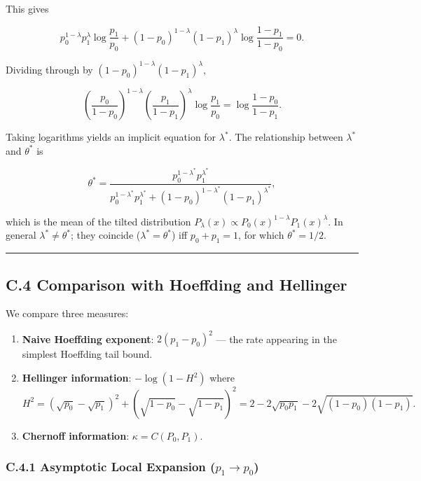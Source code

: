 \documentclass[
  12pt,
]{article}
\providecommand{\tightlist}{%
  \setlength{\itemsep}{0pt}\setlength{\parskip}{0pt}}
\begin{document}
This gives

\[
p_0^{1-\lambda}p_1^\lambda \log\frac{p_1}{p_0}
+ (1-p_0)^{1-\lambda}(1-p_1)^\lambda \log\frac{1-p_1}{1-p_0} = 0. \tag{C.5}
\]

Dividing through by \((1-p_0)^{1-\lambda}(1-p_1)^\lambda\),

\[
\left(\frac{p_0}{1-p_0}\right)^{1-\lambda}
\left(\frac{p_1}{1-p_1}\right)^{\lambda}
\log\frac{p_1}{p_0}
= \log\frac{1-p_0}{1-p_1}.
\]

Taking logarithms yields an implicit equation for \(\lambda^*\). The
relationship between \(\lambda^*\) and \(\theta^*\) is

\[
\theta^* = \frac{p_0^{1-\lambda^*} p_1^{\lambda^*}}
                 {p_0^{1-\lambda^*} p_1^{\lambda^*} + (1-p_0)^{1-\lambda^*}(1-p_1)^{\lambda^*}},
\]

which is the mean of the tilted distribution
\(P_\lambda(x) \propto P_0(x)^{1-\lambda} P_1(x)^\lambda\). In general
\(\lambda^* \neq \theta^*\); they coincide (\(\lambda^* = \theta^*\))
iff \(p_0 + p_1 = 1\), for which \(\theta^* = 1/2\).

\begin{center}\rule{0.5\linewidth}{0.5pt}\end{center}

\subsection{C.4 Comparison with Hoeffding and
Hellinger}\label{c.4-comparison-with-hoeffding-and-hellinger}

We compare three measures:

\begin{enumerate}
\def\labelenumi{\arabic{enumi}.}
\tightlist
\item
  \textbf{Naive Hoeffding exponent}: \(2(p_1-p_0)^2\) --- the rate
  appearing in the simplest Hoeffding tail bound.
\item
  \textbf{Hellinger information}: \(-\log(1-H^2)\) where \[
  H^2 = (\sqrt{p_0} - \sqrt{p_1})^2 + (\sqrt{1-p_0} - \sqrt{1-p_1})^2 = 2 - 2\sqrt{p_0 p_1} - 2\sqrt{(1-p_0)(1-p_1)}.
  \]
\item
  \textbf{Chernoff information}: \(\kappa = C(P_0,P_1)\).
\end{enumerate}

\subsubsection{\texorpdfstring{C.4.1 Asymptotic Local Expansion
(\(p_1 \to p_0\))}{C.4.1 Asymptotic Local Expansion (p\_1 \textbackslash to p\_0)}}\label{c.4.1-asymptotic-local-expansion-p_1-to-p_0}
\end{document}
